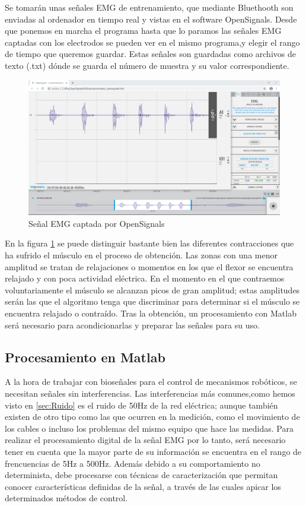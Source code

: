 Se tomarán unas señales EMG de entrenamiento, que mediante Bluethooth son enviadas al ordenador en tiempo real y vistas en el software OpenSignals. Desde que ponemos en marcha el programa hasta que lo paramos las señales EMG captadas con los electrodos se pueden ver en el mismo programa,y elegir el rango de tiempo que queremos guardar. Estas señales son guardadas como archivos de texto (.txt) dónde se guarda el número de muestra y su valor correspondiente.\newline


\begin{figure}[H]
	\center
	\includegraphics[scale=0.3]{imagenes/Disenodelsistema/Ejemplo.png}
	\caption{Señal EMG captada por OpenSignals}
	\label{fig:Ejemplo}
\end{figure}

En la figura \ref{fig:Ejemplo} se puede distinguir bastante bien las diferentes contracciones que ha sufrido el músculo en el proceso de obtención. Las zonas con una menor amplitud se tratan de relajaciones o momentos en los que el flexor se encuentra relajado y con poca actividad eléctrica. En el momento en el que contraemos voluntariamente el músculo se alcanzan picos de gran amplitud; estas amplitudes serán las que el algoritmo tenga que discriminar para determinar si el músculo se encuentra relajado o contraído.
Tras la obtención, un procesamiento con Matlab será necesario para acondicionarlas y preparar las señales para su uso.


\subsection{Procesamiento en Matlab}

A la hora de trabajar con bioseñales para el control de mecanismos robóticos, se necesitan señales sin interferencias. Las interferencias más comunes,como hemos visto en \ref{sec:Ruido} es el ruido de 50Hz de la red eléctrica; aunque también existen de otro tipo como las que ocurren en la medición, como el movimiento de los cables o incluso los problemas del mismo equipo que hace las medidas. Para realizar el procesamiento digital de la señal EMG por lo tanto, será necesario tener en cuenta que la mayor parte de su información se encuentra en el rango de frencuencias de 5Hz a 500Hz. Además debido a su comportamiento no determinista, debe procesarse con técnicas de caracterización que permitan conocer características definidas de la señal, a través de las cuales apicar los determinados métodos de control. \newline

